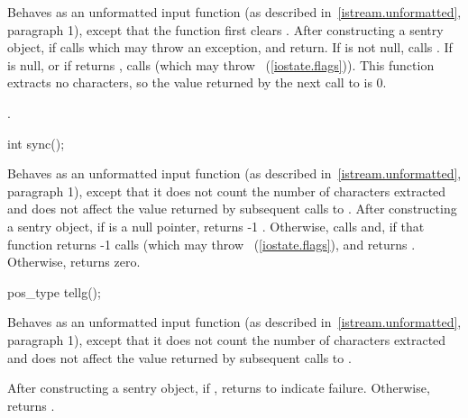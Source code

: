 \begin{itemdescr}
\pnum
\effects
Behaves as an unformatted input function (as described in~\ref{istream.unformatted}, paragraph
1), except that the function first clears .
After constructing
a sentry object, if
calls
which may throw an exception,
and return.
If
is not null, calls
.
If
is null, or if
returns
,
calls
(which may throw
~(\ref{iostate.flags})).
\enternote
This
function extracts no characters, so the value returned by the next call to
is 0.
\exitnote

\pnum
\returns
{}.
\end{itemdescr}

%
\begin{itemdecl}
int sync();
\end{itemdecl}

\begin{itemdescr}
\pnum
\effects
Behaves as an unformatted input function (as described in~\ref{istream.unformatted}, paragraph 1), except that it does not
count the number of characters extracted and does not affect the
value returned by subsequent calls to
.
After constructing
a sentry object, if
is a null pointer, returns -1 .
Otherwise, calls
and, if that function returns -1
calls
(which may throw
~(\ref{iostate.flags}),
and returns
.
Otherwise, returns zero.
\end{itemdescr}

%
%
\begin{itemdecl}
pos_type tellg();
\end{itemdecl}

\begin{itemdescr}
\pnum
\effects
Behaves as an unformatted input function (as described in~\ref{istream.unformatted}, paragraph 1), except that it does not count
the number of characters extracted and does not affect the value
returned by subsequent calls to
.

\pnum
\returns
After constructing a sentry object, if
,
returns
to indicate failure.
Otherwise, returns
.
\end{itemdescr}

